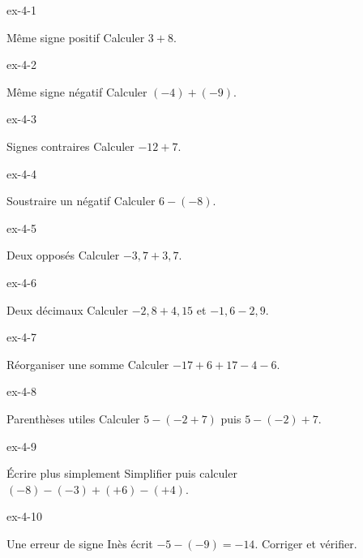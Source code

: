 \clearpage{}
\begin{blocLivre}{ex-4-1}\begin{exercice}[1]{Même signe positif}
Calculer $3+8$.
\end{exercice}\end{blocLivre}
\begin{blocLivre}{ex-4-2}\begin{exercice}[1]{Même signe négatif}
Calculer $(-4)+(-9)$.
\end{exercice}\end{blocLivre}
\begin{blocLivre}{ex-4-3}\begin{exercice}[1]{Signes contraires}
Calculer $-12+7$.
\end{exercice}\end{blocLivre}
\begin{blocLivre}{ex-4-4}\begin{exercice}[1]{Soustraire un négatif}
Calculer $6-(-8)$.
\end{exercice}\end{blocLivre}
\begin{blocLivre}{ex-4-5}\begin{exercice}[1]{Deux opposés}
Calculer $-3{,}7+3{,}7$.
\end{exercice}\end{blocLivre}

\begin{blocLivre}{ex-4-6}\begin{exercice}[2]{Deux décimaux}
Calculer $-2{,}8+4{,}15$ et $-1{,}6-2{,}9$.
\end{exercice}\end{blocLivre}
\begin{blocLivre}{ex-4-7}\begin{exercice}[2]{Réorganiser une somme}
Calculer $-17+6+17-4-6$.
\end{exercice}\end{blocLivre}
\begin{blocLivre}{ex-4-8}\begin{exercice}[2]{Parenthèses utiles}
Calculer $5-(-2+7)$ puis $5-(-2)+7$.
\end{exercice}\end{blocLivre}
\begin{blocLivre}{ex-4-9}\begin{exercice}[2]{Écrire plus simplement}
Simplifier puis calculer $(-8)-(-3)+(+6)-(+4)$.
\end{exercice}\end{blocLivre}
\begin{blocLivre}{ex-4-10}\begin{exercice}[2]{Une erreur de signe}
Inès écrit $-5-(-9)=-14$. Corriger et vérifier.
\end{exercice}\end{blocLivre}

